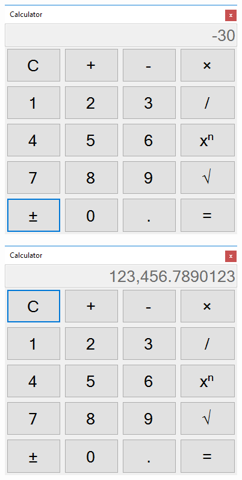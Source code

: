 \begin{figure}[ht]
 \includegraphics[scale=1]{imagini/6-sign-change}
 \centering
\end{figure}

\begin{figure}[ht]
 \includegraphics[scale=1]{imagini/7-decimal}
 \centering
\end{figure}

\clearpage